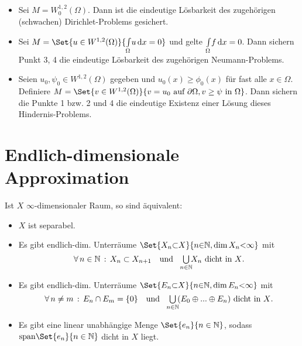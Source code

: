 \documentclass{cheat-sheet}
\begin{document}
\begin{bspe}
  \begin{itemize}
    \item Sei $M = W_0^{1,2}(\Omega)$. Dann ist die eindeutige Lösbarkeit des zugehörigen (schwachen) Dirichlet-Problems gesichert.
    \item Sei $M = \Set{ u \in W^{1,2}(\Omega) }{ \Int{\Omega}{}{u}{x} = 0 }$ und gelte ${\textstyle \int\limits_{\Omega}^{}} f \,\mathrm{d} x = 0$. Dann sichern Punkt 3, 4 die eindeutige Lösbarkeit des zugehörigen Neumann-Problems.
    \item Seien $u_0, \psi_0 \in W^{1,2}(\Omega)$ gegeben und $u_0(x) \geq \phi_0(x)$ für fast alle $x \in \Omega$. Definiere $M = \Set{ v \in W^{1,2}(\Omega) }{ v = u_0 \text{ auf } \partial \Omega, v \geq \psi \text{ in } \Omega }$. Dann sichern die Punkte 1 bzw. 2 und 4 die eindeutige Existenz einer Lösung dieses Hindernis-Problems.
  \end{itemize}
\end{bspe}



\section{Endlich-dimensionale Approximation}


\begin{lem}
  Ist $X$ $\infty$-dimensionaler Raum, so sind äquivalent:
  \begin{itemize}
    \item $X$ ist separabel.
    \item Es gibt endlich-dim. Unterräume $\Set{X_n {\subset} X}{ n {\in} \N, \dim X_n {<} \infty }$ mit
    \[
      \fa{n \in \N} X_n \subset X_{n{+}1}
      \quad \text{und} \quad
      \bigcup_{\mathclap{n \in \N}} X_n \text{ dicht in $X$.}
    \]
    \item Es gibt endlich-dim. Unterräume $\Set{E_n {\subset} X}{ n {\in} \N, \dim E_n {<} \infty }$ mit
    \[
      \fa{n \not= m} E_n \cap E_m = \{0\}
      \quad \text{und} \quad
      \bigcup_{\mathclap{n \in \N}} \, (E_0 \oplus ... \oplus E_n) \text{ dicht in $X$.}
    \]
    \item Es gibt eine linear unabhängige Menge $\Set{ e_n }{ n \in \N }$, sodass $\mathrm{span}\Set{e_n}{ n \in \N }$ dicht in $X$ liegt.
  \end{itemize}
\end{lem}
\end{document}
